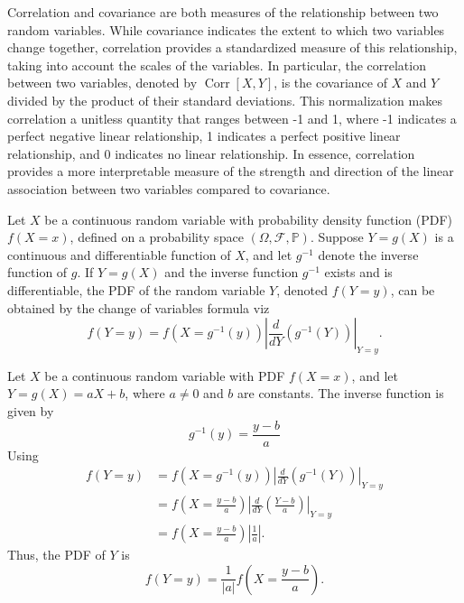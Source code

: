 \begin{remark}
	Correlation and covariance are both measures of the relationship between two random variables. While covariance indicates the extent to which two variables change together, correlation provides a standardized measure of this relationship, taking into account the scales of the variables. In particular, the correlation between two variables, denoted by $\operatorname{Corr}[X, Y]$, is the covariance of $X$ and $Y$ divided by the product of their standard deviations. This normalization makes correlation a unitless quantity that ranges between -1 and 1, where -1 indicates a perfect negative linear relationship, 1 indicates a perfect positive linear relationship, and 0 indicates no linear relationship. In essence, correlation provides a more interpretable measure of the strength and direction of the linear association between two variables compared to covariance.
\end{remark}

\begin{definition}
	\label{def:change_of_variables}
	Let $X$ be a continuous random variable with probability density function (PDF) $f(X =x)$, defined on a probability space $(\Omega, \mathcal{F},\mathbb{P})$. Suppose $Y = g(X)$ is a continuous and differentiable function of $X$, and let $g^{-1}$ denote the inverse function of $g$. If $Y = g(X)$ and the inverse function $g^{-1}$ exists and is differentiable, the PDF of the random variable $Y$, denoted $f(Y=y)$, can be obtained by the change of variables formula viz~\cite{Sivia2006}
	\begin{equation}
		f(Y = y) = f(X = g^{-1}(y)) \left| \frac{d}{d Y} \left( g^{-1}(Y) \right) \right|_{Y=y}.
		\label{eq:change_of_variables}
	\end{equation}
\end{definition}

\begin{example}
	Let $X$ be a continuous random variable with PDF $f(X =x)$, and let $Y = g(X) = aX + b$, where $a \neq 0$ and $b$ are constants. The inverse function is given by
	\begin{equation}
		g^{-1}(y) = \frac{y - b}{a}
	\end{equation}
	Using 
	\begin{equation}
		\begin{split}
			f(Y=y) &= f\left( X = g^{-1}(y) \right) \left| \frac{d}{d Y} \left( g^{-1}(Y) \right) \right|_{Y=y} \\
			&= f\left(X =  \frac{y - b}{a} \right) \left| \frac{d}{d Y} \left( \frac{Y - b}{a} \right) \right|_{Y=y} \\
			&= f\left(X = \frac{y - b}{a} \right) \left| \frac{1}{a} \right|.
		\end{split}
	\end{equation}
	Thus, the PDF of $Y$ is
	\begin{equation}
		f(Y= y) = \frac{1}{|a|} f\left(X =  \frac{y - b}{a} \right).
	\end{equation}
\end{example}

